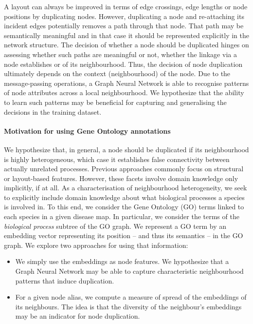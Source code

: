 \documentclass[
	fontsize=10pt, %
	twoside=false, %
	secnumdepth=1, %
  toc=indentunnumbered %
]{kaobook}
\begin{document}
A layout can always be improved in terms of edge crossings, edge lengths or node
positions by duplicating nodes. However, duplicating a node and re-attaching its
incident edges potentially removes a path through that node. That path
may be semantically meaningful and in that case it should be represented
explicitly in the network structure.
The decision of whether a node should be duplicated hinges on
assessing whether such paths are meaningful or not, \ie whether the linkage via
a node establishes  or  of its neighbourhood.
Thus, the decision of node duplication ultimately depends on the context
(neighbourhood) of the node.
%
Due to the message-passing operations, a Graph Neural
Network is able to recognise patterns of node attributes across a local
neighbourhood. We hypothesize that the ability to learn such patterns may be
beneficial for capturing and generalising the decisions in the training dataset.



\paragraph{Motivation for using Gene Ontology annotations}
We hypothesize that, in general, a node should be duplicated if its
neighbourhood is highly heterogeneous, which case it establishes false
connectivity between actually unrelated processes.
Previous approaches commonly focus on structural or layout-based features.
However, these facets involve domain knowledge only implicitly, if at all.
As a characterisation of neighbourhood heterogeneity, we seek
to explicitly include domain knowledge about what biological processes a species
is involved in. To this end, we consider the Gene Ontology (GO) terms linked to each
species in a given disease map. In particular, we consider the terms of the
\textit{biological process} subtree of the GO graph.
%
We represent a GO term by an embedding vector representing its position -- and
thus its semantics -- in the GO graph. We explore two approaches for using that
information:
\begin{itemize}
\item We simply use the embeddings as node features. We hypothesize that a Graph
  Neural Network may be able to capture characteristic neighbourhood patterns
  that induce duplication.
\item For a given node alias, we compute a measure of spread of the embeddings
  of its neighbours. The idea is that the diversity of the neighbour's
  embeddings may be an indicator for node duplication.
\end{itemize}
\end{document}
